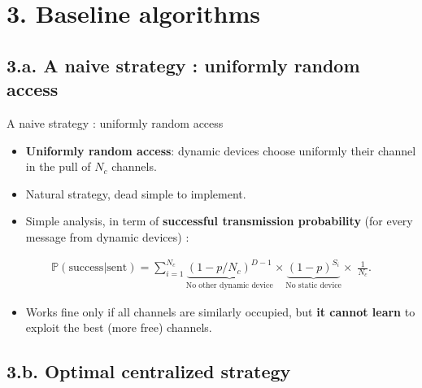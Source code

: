 \documentclass[12pt,english,ignorenonframetext,aspectratio=169,]{beamer}
\providecommand{\tightlist}{%
  \setlength{\itemsep}{0pt}\setlength{\parskip}{0pt}}
\begin{document}
\section{\hfill{}3. Baseline algorithms\hfill{}}

\subsection{\hfill{}3.a. A naive strategy : uniformly random access\hfill{}}

\begin{frame}{A naive strategy : uniformly random access}

\begin{itemize}
\tightlist
\item
  \textbf{Uniformly random access}: dynamic devices choose uniformly
  their channel in the pull of \(N_c\) channels.
\item
  Natural strategy, dead simple to implement.
\end{itemize}

\pause

\begin{itemize}
\tightlist
\item
  Simple analysis, in term of \textbf{successful transmission
  probability} (for every message from dynamic devices) :
\end{itemize}

\begin{small} \begin{align*}
\mathbb{P}(\text{success}|\text{sent}) = \sum_{i=1}^{N_c} \underbrace{(1 - p / N_c)^{D-1}}_{\text{No other dynamic device}} \times \underbrace{(1-p)^{S_i}}_{\text{No static device}} \times\; \frac{1}{N_c}.
\end{align*} \end{small}

\pause

\begin{itemize}
\tightlist
\item
  Works fine only if all channels are similarly occupied,\newline
   but \textbf{it cannot learn} to exploit the best (more free)
  channels.
\end{itemize}

\end{frame}



\subsection{\hfill{}3.b. Optimal centralized strategy\hfill{}}
\end{document}
